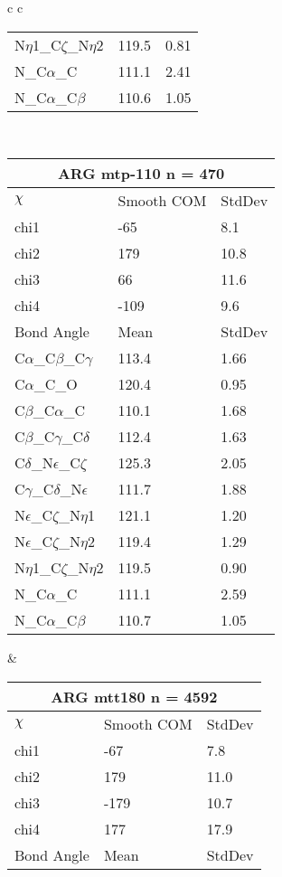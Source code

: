\begin{longtable}{ c c }
\begin{tabular}{ l l l }
  N$\eta$1\_C$\zeta$\_N$\eta$2 & 119.5 & 0.81\\
  N\_C$\alpha$\_C & 111.1 & 2.41\\
  N\_C$\alpha$\_C$\beta$ & 110.6 & 1.05\\
  \bottomrule
  \end{tabular}
  \\
  \begin{tabular}{ l l l }
  \toprule
  \multicolumn{3}{c}{ARG \textbf{mtp-110} n = 470} \\ \toprule
  $\chi$       & Smooth COM & StdDev \\ \midrule
  chi1 & -65 & 8.1 \\ 
  chi2 & 179 & 10.8 \\ 
  chi3 & 66 & 11.6 \\ 
  chi4 & -109 & 9.6 \\ \midrule
  Bond Angle   & Mean     & StdDev \\ \midrule
  C$\alpha$\_C$\beta$\_C$\gamma$ & 113.4 & 1.66\\
  C$\alpha$\_C\_O & 120.4 & 0.95\\
  C$\beta$\_C$\alpha$\_C & 110.1 & 1.68\\
  C$\beta$\_C$\gamma$\_C$\delta$ & 112.4 & 1.63\\
  C$\delta$\_N$\epsilon$\_C$\zeta$ & 125.3 & 2.05\\
  C$\gamma$\_C$\delta$\_N$\epsilon$ & 111.7 & 1.88\\
  N$\epsilon$\_C$\zeta$\_N$\eta$1 & 121.1 & 1.20\\
  N$\epsilon$\_C$\zeta$\_N$\eta$2 & 119.4 & 1.29\\
  N$\eta$1\_C$\zeta$\_N$\eta$2 & 119.5 & 0.90\\
  N\_C$\alpha$\_C & 111.1 & 2.59\\
  N\_C$\alpha$\_C$\beta$ & 110.7 & 1.05\\
  \bottomrule
  \end{tabular}
  &
  \begin{tabular}{ l l l }
  \toprule
  \multicolumn{3}{c}{ARG \textbf{mtt180} n = 4592} \\ \toprule
  $\chi$       & Smooth COM & StdDev \\ \midrule
  chi1 & -67 & 7.8 \\ 
  chi2 & 179 & 11.0 \\ 
  chi3 & -179 & 10.7 \\ 
  chi4 & 177 & 17.9 \\ \midrule
  Bond Angle   & Mean     & StdDev \\ \midrule

\end{tabular}
\end{longtable}
